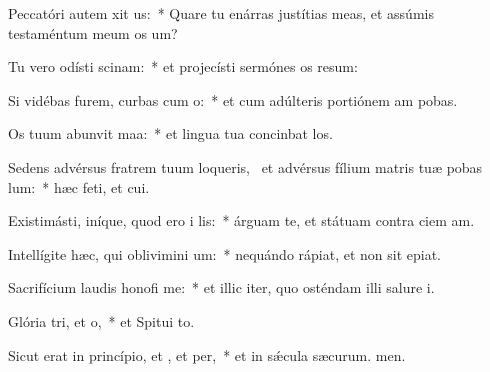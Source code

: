 \item Peccatóri autem xit us:~* Quare tu enárras justítias meas, et assúmis testaméntum meum  os um?
\item Tu vero odísti scinam:~* et projecísti sermónes os resum:
\item Si vidébas furem, curbas cum o:~* et cum adúlteris portiónem am pobas.
\item Os tuum abunvit maa:~* et lingua tua concinbat los.
\item Sedens advérsus fratrem tuum loqueris,~\pscross{} et advérsus fílium matris tuæ pobas lum:~* hæc feti, et cui.
\item Existimásti, iníque, quod ero i lis:~* árguam te, et státuam contra ciem am.
\item Intellígite hæc, qui oblivimini um:~* nequándo rápiat, et non sit  epiat.
\item Sacrifícium laudis honofi me:~* et illic iter, quo osténdam illi salure i.
\item Glória tri, et o,~* et Spitui to.
\item Sicut erat in princípio, et , et per,~* et in sǽcula sæcurum. men.
